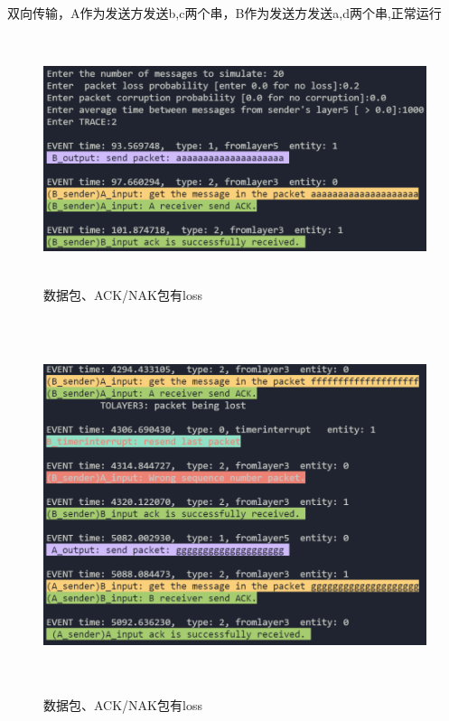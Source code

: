 \documentclass[UTF8,14pt]{article}
\numberwithin{figure}{section}
\begin{document}
双向传输，A作为发送方发送b,c两个串，B作为发送方发送a,d两个串,正常运行
\clearpage
\begin{center}
      \begin{figure}[!ht]
            \centering
            \includegraphics[width=15cm,height=7.24cm]{figures/result3_1.png}
            \caption{数据包、ACK/NAK包有loss}
      \end{figure}
      \begin{figure}[!ht]
            \centering
            \includegraphics[width=15cm,height=11cm]{figures/result3_2.png}
            \caption{数据包、ACK/NAK包有loss}
      \end{figure}
\end{center}
\vspace{-1.5cm}
\end{document}
